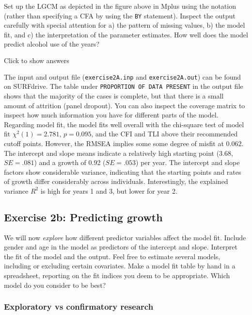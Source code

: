 \documentclass[
]{book}
\begin{document}
Set up the LGCM as depicted in the figure above in Mplus using the \texttt{\textbar{}} notation (rather than specifying a CFA by using the \texttt{BY} statement). Inspect the output carefully with special attention for a) the pattern of missing values, b) the model fit, and c) the interpretation of the parameter estimates. How well does the model predict alcohol use of the years?

Click to show answers

The input and output file (\texttt{exercise2A.inp} and \texttt{exercise2A.out}) can be found on SURFdrive. The table under \texttt{PROPORTION\ OF\ DATA\ PRESENT} in the output file shows that the majority of the cases is complete, but that there is a small amount of attrition (panel dropout). You can also inspect the coverage matrix to inspect how much information you have for different parts of the model. Regarding model fit, the model fits well overall with the chi-square test of model fit \(\chi^{2}(1) = 2.781\), \(p = 0.095\), and the CFI and TLI above their recommended cutoff points. However, the RMSEA implies some some degree of misfit at \(0.062\). The intercept and slope means indicate a relatively high starting point (3.68, \(SE = .081\)) and a growth of 0.92 (\(SE = .053\)) per year. The intercept and slope factors show considerable variance, indicating that the starting points and rates of growth differ considerably across individuals. Interestingly, the explained variance \(R^{2}\) is high for years 1 and 3, but lower for year 2.

\hypertarget{exercise-2b-predicting-growth}{%
\subsection{Exercise 2b: Predicting growth}\label{exercise-2b-predicting-growth}}

We will now \emph{explore} how different predictor variables affect the model fit. Include gender and age in the model as predictors of the intercept and slope. Interpret the fit of the model and the output. Feel free to estimate several models, including or excluding certain covariates. Make a model fit table by hand in a spreadsheet, reporting on the fit indices you deem to be appropriate. Which model do you consider to be best?

\hypertarget{exploratory-vs-confirmatory-research}{%
\subsubsection{Exploratory vs confirmatory research}\label{exploratory-vs-confirmatory-research}}
\end{document}
